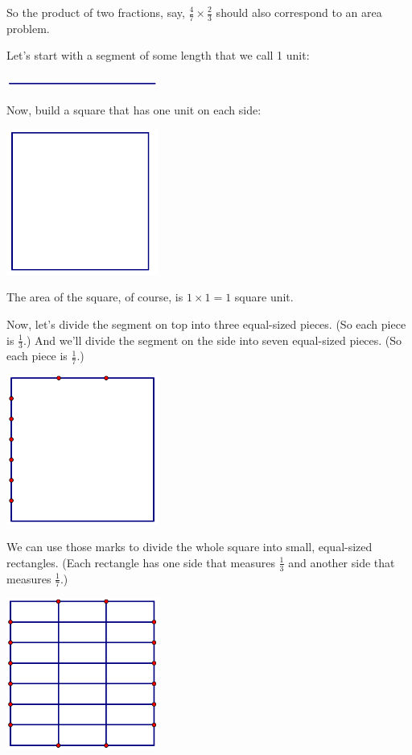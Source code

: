 So the product of two fractions, say, $\frac 4 7 \times \frac 2 3$
should also correspond to an area
problem.


\begin{example}
Let's  start with a  segment of some length that we call 1 unit:
\begin{center}
 \includegraphics[width = 5cm]{unitseg}
\end{center}
Now, build a square that has one unit on each side:
\begin{center}
 \includegraphics[width = 5cm]{unitsq}
\end{center}
The area of the square, of course, is $1 \times 1 = 1$ square unit.

Now, let's divide the segment on top into three equal-sized pieces.  (So each piece is $\frac 1 3$.)  And we'll divide the segment on the side into seven equal-sized pieces.  (So each piece is $\frac 1 7$.)
\begin{center}
 \includegraphics[width = 5cm]{unitsqdiv}
\end{center}
We can use those marks to divide the whole square into small, equal-sized rectangles.  (Each rectangle has one side that measures $\frac 1 3$ and another side that measures $\frac 1 7$.)
\begin{center}
 \includegraphics[width = 5cm]{unitsqdiv2}
\end{center}




\end{example}
